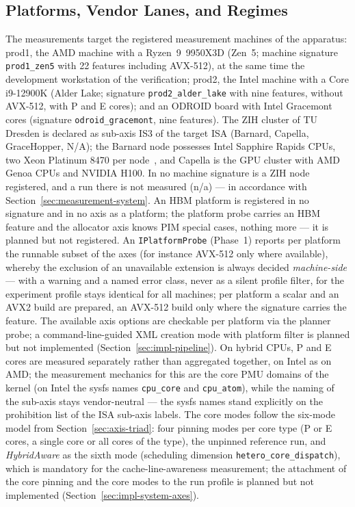 \begin{nurlang}
\subsection{Platforms, Vendor Lanes, and Regimes}\label{sec:eval-platforms}
The measurements target the registered measurement machines of the apparatus: prod1, the AMD machine
with a Ryzen~9~9950X3D (Zen~5; machine signature \texttt{prod1\_zen5} with 22 features including AVX-512), %
at the same time the development workstation of the verification; prod2, the Intel machine with a
Core i9-12900K (Alder Lake; signature \texttt{prod2\_alder\_lake} with nine features, without
AVX-512, with P and E cores); and an ODROID board with Intel Gracemont cores (signature
\texttt{odroid\_gracemont}, nine features). The ZIH cluster of TU Dresden is declared as sub-axis IS3
of the target ISA (Barnard, Capella, GraceHopper, N/A); the Barnard node possesses Intel Sapphire
Rapids CPUs, two Xeon Platinum 8470 per node~\cite{zih_hpc_compendium_hardware}, and Capella is the
GPU cluster with AMD Genoa CPUs and NVIDIA H100. In no machine signature is a ZIH node registered, and
a run there is not measured (n/a) --- in accordance with Section~\ref{sec:measurement-system}. An HBM
platform is registered in no signature and in no axis as a platform; the platform probe carries an HBM
feature and the allocator axis knows PIM special cases, nothing more --- it is planned but not
registered. An \texttt{IPlatformProbe} (Phase~1) reports per platform the runnable subset of the axes
(for instance AVX-512 only where available), whereby the exclusion of an unavailable extension is
always decided \emph{machine-side} --- with a warning and a named error class, never as a silent
profile filter, for the experiment profile stays identical for all machines; per platform a scalar and
an AVX2 build are prepared, an AVX-512 build only where the signature carries the feature. The
available axis options are checkable per platform via the planner probe; a command-line-guided XML
creation mode with platform filter is planned but not implemented
(Section~\ref{sec:impl-pipeline}). On hybrid CPUs, P and E cores are measured separately rather than
aggregated together, on Intel as on AMD\@; the measurement mechanics for this are the core PMU
domains of the kernel (on Intel the sysfs names \texttt{cpu\_core} and \texttt{cpu\_atom}), while the
naming of the sub-axis stays vendor-neutral --- the sysfs names stand explicitly on the prohibition
list of the ISA sub-axis labels. The core modes follow the six-mode model from
Section~\ref{sec:axis-triad}: four pinning modes per core type (P or E cores, a single core or all
cores of the type), the unpinned reference run, and \emph{HybridAware} as the sixth mode (scheduling
dimension \texttt{hetero\_core\_dispatch}), which is mandatory for the cache-line-awareness
measurement; the attachment of the core pinning and the core modes to the run profile is planned but
not implemented (Section~\ref{sec:impl-system-axes}).
\end{nurlang}
